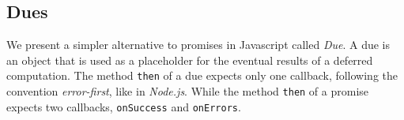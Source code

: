 


\subsection{Dues} \label{section:definitions:due}

We present a simpler alternative to promises in Javascript called \textit{Due}.
A due is an object that is used as a placeholder for the eventual results of a deferred computation.
The method \texttt{then} of a due expects only one callback, following the convention \textit{error-first}, like in \textit{Node.js}.%
While the method \texttt{then} of a promise expects two callbacks, \texttt{onSuccess} and \texttt{onErrors}. 

